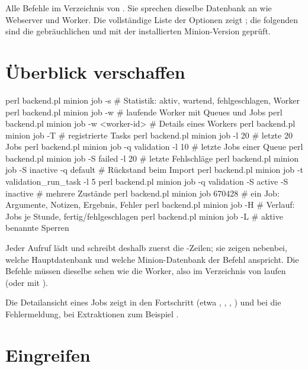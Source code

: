\documentclass[11pt,a4paper,parskip=half-,headings=standardclasses,toc=bibliography,open=any]{scrreprt}
\begin{document}
Alle Befehle im Verzeichnis von . Sie sprechen dieselbe Datenbank an wie Webserver und Worker. Die vollständige Liste der Optionen zeigt ; die folgenden sind die gebräuchlichen und mit der installierten Minion-Version geprüft.

\section{Überblick verschaffen}

\begin{befehl}
perl backend.pl minion job -s                         # Statistik: aktiv, wartend, fehlgeschlagen, Worker
perl backend.pl minion job -w                         # laufende Worker mit Queues und Jobs
perl backend.pl minion job -w <worker-id>             # Details eines Workers
perl backend.pl minion job -T                         # registrierte Tasks
perl backend.pl minion job -l 20                      # letzte 20 Jobs
perl backend.pl minion job -q validation -l 10        # letzte Jobs einer Queue
perl backend.pl minion job -S failed -l 20            # letzte Fehlschläge
perl backend.pl minion job -S inactive -q default     # Rückstand beim Import
perl backend.pl minion job -t validation_run_task -l 5
perl backend.pl minion job -q validation -S active -S inactive   # mehrere Zustände
perl backend.pl minion job 670428                     # ein Job: Argumente, Notizen, Ergebnis, Fehler
perl backend.pl minion job -H                         # Verlauf: Jobs je Stunde, fertig/fehlgeschlagen
perl backend.pl minion job -L                         # aktive benannte Sperren
\end{befehl}

Jeder Aufruf lädt  und schreibt deshalb zuerst die \code{[CONFIG]}-Zeilen; sie zeigen nebenbei, welche Hauptdatenbank und welche Minion-Datenbank der Befehl anspricht. Die Befehle müssen dieselbe  sehen wie die Worker, also im Verzeichnis von  laufen (oder mit ).

Die Detailansicht eines Jobs zeigt in  den Fortschritt (etwa , , , ) und bei  die Fehlermeldung, bei Extraktionen zum Beispiel .

\section{Eingreifen}
\end{document}
